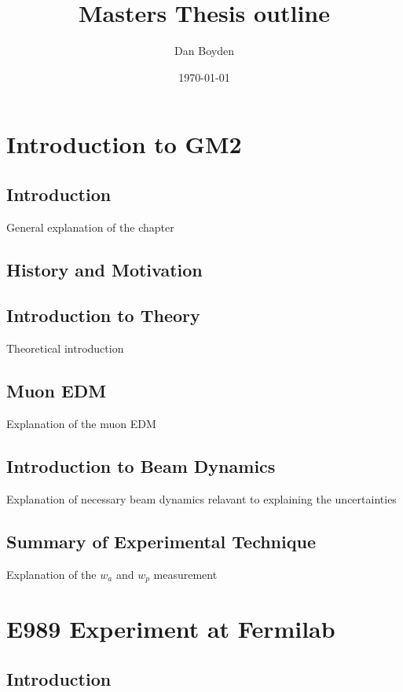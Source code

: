 \documentclass[11pt, oneside]{article}   	%
\title{Masters Thesis outline}
\author{Dan Boyden}						%
\date{\today}
\begin{document}
\maketitle	


\titlespacing*{\subsection}{\parindent}{1ex}{1em}
\titlespacing*{\subsubsection}{\parindent}{1ex}{1em}


\section{Introduction to GM2}
        \subsection{Introduction}
		General explanation of the chapter
	\subsection{History and Motivation}
	\subsection{Introduction to Theory}
		Theoretical introduction
	\subsection{Muon EDM}
		Explanation of the muon EDM 
	\subsection{Introduction to Beam Dynamics}
		Explanation of necessary beam dynamics relavant to explaining the uncertainties
	\subsection{Summary of Experimental Technique}
		Explanation of the $w_a $ and $w_p$ measurement
	
	
\section{E989 Experiment at Fermilab}
	\subsection{Introduction}
\end{document}
